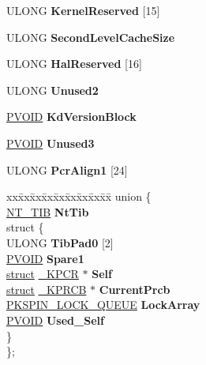 \begin{DoxyCompactItemize}
\mbox{\label{struct___k_p_c_r_a8e7c08a9ed6f9ea56d3a4a246237adef}} 
U\+L\+O\+NG {\bfseries Kernel\+Reserved} \mbox{[}15\mbox{]}
\item 
\mbox{\label{struct___k_p_c_r_a831f2cc1c50baf791947baaf922be294}} 
U\+L\+O\+NG {\bfseries Second\+Level\+Cache\+Size}
\item 
\mbox{\label{struct___k_p_c_r_ae39299aa91ad1c911e12c7a2e4087967}} 
U\+L\+O\+NG {\bfseries Hal\+Reserved} \mbox{[}16\mbox{]}
\item 
\mbox{\label{struct___k_p_c_r_acea81cc574b3c90e288bfef127250a1a}} 
U\+L\+O\+NG {\bfseries Unused2}
\item 
\mbox{\label{struct___k_p_c_r_a959cebf7f5dd9875cb444ec0da3705ba}} 
\hyperlink{interfacevoid}{P\+V\+O\+ID} {\bfseries Kd\+Version\+Block}
\item 
\mbox{\label{struct___k_p_c_r_aa9ccfbd76b4dcbbc9184fc8c85f34d0b}} 
\hyperlink{interfacevoid}{P\+V\+O\+ID} {\bfseries Unused3}
\item 
\mbox{\label{struct___k_p_c_r_a8e5f523f63d205051c6188d428f4e4e1}} 
U\+L\+O\+NG {\bfseries Pcr\+Align1} \mbox{[}24\mbox{]}
\item 
\mbox{\label{struct___k_p_c_r_ac2fb1fef04821c7bd1b550a3d937c6e7}} 
\begin{tabbing}
xx\=xx\=xx\=xx\=xx\=xx\=xx\=xx\=xx\=\kill
union \{\\
\>\hyperlink{struct___n_t___t_i_b}{NT\_TIB} {\bfseries NtTib}\\
\mbox{\label{union___k_p_c_r_1_1_0D3208_a5126b5919bd918a20f9514dba74f81a0}} 
\>struct \{\\
\>\>ULONG {\bfseries TibPad0} \mbox{[}2\mbox{]}\\
\>\>\hyperlink{interfacevoid}{PVOID} {\bfseries Spare1}\\
\>\>\hyperlink{interfacestruct}{struct} \hyperlink{struct___k_p_c_r}{\_KPCR} $\ast$ {\bfseries Self}\\
\>\>\hyperlink{interfacestruct}{struct} \hyperlink{struct___k_p_r_c_b}{\_KPRCB} $\ast$ {\bfseries CurrentPrcb}\\
\>\>\hyperlink{struct___k_s_p_i_n___l_o_c_k___q_u_e_u_e}{PKSPIN\_LOCK\_QUEUE} {\bfseries LockArray}\\
\>\>\hyperlink{interfacevoid}{PVOID} {\bfseries Used\_Self}\\
\>\} \\
\}; \\


\end{tabbing}
\end{DoxyCompactItemize}
